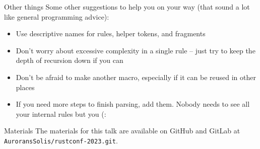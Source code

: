 \documentclass{beamer}
\begin{document}
	\begin{frame}{Other things}
		Some other suggestions to help you on your way (that sound a lot like general programming
		advice):
		\begin{itemize}
			\item Use descriptive names for rules, helper tokens, and fragments
			\item Don't worry about excessive complexity in a single rule -- just try to keep the
				depth of recursion down if you can
			\item Don't be afraid to make another macro, especially if it can be reused in other
				places
			\item If you need more steps to finish parsing, add them. Nobody needs to see all your
				internal rules but you (:
		\end{itemize}
	\end{frame}

	\begin{frame}{Materials}
		The materials for this talk are available on GitHub and GitLab at
		\texttt{AuroransSolis/rustconf-2023.git}.
	\end{frame}
\end{document}

